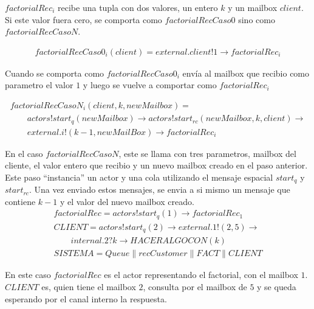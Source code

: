\documentclass[fleqn]{article}
\begin{document}
$factorialRec_i$ recibe una tupla con dos valores, un entero $k$ y un mailbox $client$. Si este valor fuera cero, se comporta como $factorialRecCaso0$ sino como $factorialRecCasoN$. 

\begin{gather*}
factorialRecCaso0_i(client) = external.client!1 \rightarrow factorialRec_i 
\end{gather*}

Cuando se comporta como $factorialRecCaso0_i$ envía al mailbox que recibio como parametro el valor $1$ y luego se vuelve a comportar como $factorialRec_i$

\begin{gather*}
factorialRecCasoN_i(client,k, newMailbox) = \\
  \qquad actors!start_q(newMailbox) \rightarrow actors!start_{rc}(newMailbox, k, client) \rightarrow \\
  \qquad external.i!(k - 1, newMailBox) \rightarrow factorialRec_i
\end{gather*}

En el caso $factorialRecCasoN$, este se llama con tres parametros, mailbox del cliente, el valor entero que recibio y un nuevo mailbox creado en el paso anterior. Este paso ``instancia'' un actor y una cola utilizando el mensaje espacial $start_q$ y $start_{rc}$. Una vez enviado estos mensajes, se envia a si mismo un mensaje que contiene $k - 1$ y el valor del nuevo mailbox creado.\\

\begin{gather*}
factorialRec =
  actors!start_q(1) \rightarrow factorialRec_1 \\
CLIENT =
  actors!start_q(2) \rightarrow external.1!(2,5) \rightarrow \\
\qquad internal.2?k \rightarrow HACERALGOCON(k) \\
SISTEMA = Queue \parallel recCustomer \parallel FACT \parallel CLIENT
\end{gather*}

En este caso $factorialRec$ es el actor representando el factorial, con el mailbox $1$. $CLIENT$ es, quien tiene el mailbox $2$, consulta por el mailbox de $5$ y se queda esperando por el canal interno la respuesta.

{}

\end{document}
